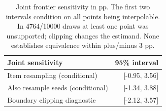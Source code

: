 \begin{table}[H]
\centering
\small
\setlength{\tabcolsep}{3pt}
\begin{tabular}{p{}r}
\toprule
Joint sensitivity & 95\% interval \\
\midrule
Item resampling (conditional) & [-0.95, 3.56] \\
Also resample seeds (conditional) & [-1.34, 3.88] \\
Boundary clipping diagnostic & [-2.12, 3.57] \\
\bottomrule
\end{tabular}
\caption{Joint frontier sensitivity in pp. The first two intervals condition on all points being interpolable. In 4764/10000 draws at least one point was unsupported; clipping changes the estimand. None establishes equivalence within plus/minus 3 pp.}
\label{tab:frontierjoint}
\end{table}
